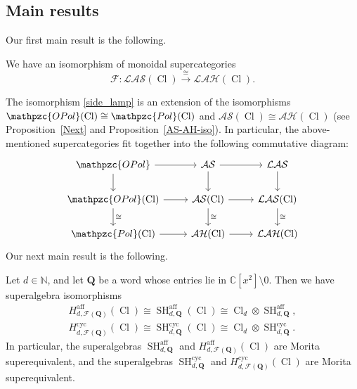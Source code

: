 \documentclass[11pt]{amsart}
\newenvironment{customthm}[1]
  {\renewcommand\theinnercustomthm{#1}\innercustomthm}
  {\endinnercustomthm}
\theoremstyle{definition}
\numberwithin{equation}{section}
\begin{document}
\subsection{Main results} 

Our first main result is the following.

\begin{customthm} {\bf A} [Theorem~\ref{Morita_equiv2}]
We have an isomorphism of monoidal supercategories 
\begin{equation} \label{side_lamp}
\mathcal{F} \colon \mathcal{LAS}(\operatorname{Cl}) \xrightarrow{\cong} \mathcal{LAH}(\operatorname{Cl}).
\end{equation}
\end{customthm} 

The isomorphism \cref{side_lamp} is an extension of the isomorphisms $ \mathpzc{OPol}(\operatorname{Cl}) \cong \mathpzc{Pol}(\operatorname{Cl}) $ and $ \mathcal{AS}(\operatorname{Cl}) \cong \mathcal{AH}(\operatorname{Cl}) $ (see Proposition~\ref{Next} and Proposition~\ref{AS-AH-iso}). In particular, the above-mentioned supercategories fit together into the following commutative diagram:
\begin{equation}
\begin{tikzcd}
\mathpzc{OPol} \arrow[d] \arrow[r] & \mathcal{AS} \arrow[r] \arrow[d] & \mathcal{LAS} \arrow[d] \\
\mathpzc{OPol}(\operatorname{Cl}) \arrow[d, "\cong"] \arrow[r] & \mathcal{AS}(\operatorname{Cl}) \arrow[r] \arrow[d, "\cong"] & \mathcal{LAS}(\operatorname{Cl}) \arrow[d, "\cong"] \\
\mathpzc{Pol}(\operatorname{Cl}) \arrow[r] & \mathcal{AH}(\operatorname{Cl}) \arrow[r] & \mathcal{LAH}(\operatorname{Cl})
\end{tikzcd}
\end{equation}
Our next main result is the following.

\begin{customthm} {\bf B} [Theorem~\ref{Morita_result}]
Let $ d \in \mathbb{N} $, and let $ \mathbf{Q} $ be a word whose entries lie in $ \mathbb{C}[x^{2}] \setminus 0 $. Then we have superalgebra isomorphisms
\begin{align}
H_{d,\mathcal{F}(\mathbf{Q})}^{\operatorname{aff}}(\operatorname{Cl}) \cong \operatorname{SH}^{\operatorname{aff}}_{d,\mathbf{Q}}(\operatorname{Cl}) \cong \operatorname{Cl}_{d} \otimes \operatorname{SH}^{\operatorname{aff}}_{d,\mathbf{Q}}, \label{free}
\\ H_{d,\mathcal{F}(\mathbf{Q})}^{\operatorname{cyc}}(\operatorname{Cl}) \cong \operatorname{SH}^{\operatorname{cyc}}_{d,\mathbf{Q}}(\operatorname{Cl}) \cong \operatorname{Cl}_{d} \otimes \operatorname{SH}^{\operatorname{cyc}}_{d,\mathbf{Q}}.
\end{align}
In particular, the superalgebras $ \operatorname{SH}^{\operatorname{aff}}_{d,\mathbf{Q}} $ and $ H_{d,\mathcal{F}(\mathbf{Q})}^{\operatorname{aff}}(\operatorname{Cl}) $ are Morita superequivalent, and the superalgebras $ \operatorname{SH}^{\operatorname{cyc}}_{d,\mathbf{Q}} $ and $ H_{d,\mathcal{F}(\mathbf{Q})}^{\operatorname{cyc}}(\operatorname{Cl}) $ are Morita superequivalent. 
\end{customthm} 
\end{document}
